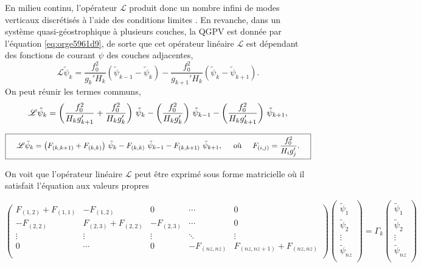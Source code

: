 \documentclass[10pt]{article}
\numberwithin{equation}{section}
\newcommand{\tpsi}{\tilde{\psi}}
\begin{document}
En milieu continu, l'opérateur \(\mathscr{L}\) produit donc un nombre infini de modes verticaux discrétisés à l'aide des conditions limites \autocite[p.468]{vallis_2006}.
En revanche, dans un système quasi-géostrophique à plusieurs couches, la QGPV est donnée par l'équation \ref{eq:orge5961d9}, de sorte que cet opérateur linéaire \(\mathscr{L}\) est dépendant des fonctions de courant \(\psi\) des couches adjacentes,
\begin{equation}
\mathscr{L}\tpsi_k = \frac{f_0^2}{g_k' H_k} (\tpsi_{k-1} - \tpsi_k) - \frac{f_0^2}{g_{k+1}'H_k} (\tpsi_k - \tpsi_{k+1}).
\end{equation}
On peut réunir les termes communs,
\begin{align}
\mathscr{L} \tpsi_k = \qty( \frac{f_0^2}{H_k g'_{k+1}} + \frac{f_0^2}{H_k g'_{k}} )\ \tpsi_k
- \qty(\frac{f_0^2}{H_k g'_{k}})\ \tpsi_{k-1}
- \qty(\frac{f_0^2}{H_k g'_{k+1}})\ \tpsi_{k+1},\nonumber
\end{align}

\begin{equation}
\boxed{\hspace{0.4cm}
\mathscr{L}\tpsi_k = \qty( F_{(k,k+1)} + F_{(k,k)}) \ \tpsi_k
- F_{(k,k)}\ \tpsi_{k-1}
- F_{(k,k+1)}\ \tpsi_{k+1},
\hspace{0.5cm}\text{où}\hspace{0.5cm}
F_{(i,j)} = \frac{f_0^2}{H_i g'_j}.
\hspace{0.4cm} }
\end{equation}

On voit que l'opérateur linéaire \(\mathscr{L}\) peut être exprimé sous forme matricielle où il satisfait l'équation aux valeurs propres

\[
\begin{pmatrix}
 F_{(1,2)} + F_{(1,1)} & -F_{(1,2)} & 0 & \cdots & 0 \\[0pt]
 -F_{(2,2)} & F_{(2,3)} + F_{(2,2)} & -F_{(2,3)} & \cdots & 0 \\[0pt]
 \vdots & \vdots & \vdots & \ddots & \vdots \\[0pt]
 0 & \cdots & 0 & -F_{(nz,nz)} & F_{(nz,nz+1)} + F_{(nz,nz)} \\[0pt]
\end{pmatrix}
\begin{pmatrix}
 \tpsi_1 \\[0pt]
 \tpsi_2 \\[0pt]
 \vdots \\[0pt]
 \tpsi_{nz} \\[0pt]
\end{pmatrix}
=\Gamma_k\begin{pmatrix}
 \tpsi_1 \\[0pt]
 \tpsi_2 \\[0pt]
 \vdots \\[0pt]
 \tpsi_{nz} \\[0pt]
\end{pmatrix}
\]
\end{document}

